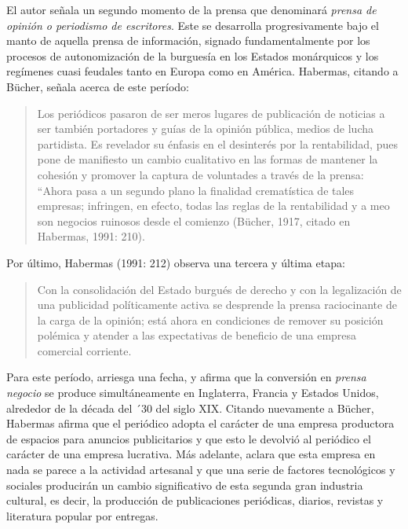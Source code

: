 {El autor señala un segundo momento de la prensa que denominará \emph{prensa de opinión o periodismo de escritores}. Este se desarrolla progresivamente bajo el manto de aquella prensa de información, signado fundamentalmente por los procesos de autonomización de la burguesía en los Estados monárquicos y los regímenes cuasi feudales tanto en Europa como en América. Habermas, citando a Bücher, señala acerca de este período:

\begin{quote}
Los periódicos pasaron de ser meros lugares de publicación de noticias a ser también portadores y guías de la opinión pública, medios de lucha partidista. Es revelador su énfasis en el desinterés por la rentabilidad, pues pone de manifiesto un cambio cualitativo en las formas de mantener la cohesión y promover la captura de voluntades a través de la prensa: ``Ahora pasa a un segundo plano la finalidad crematística de tales empresas; infringen, en efecto, todas las reglas de la rentabilidad y a meo son negocios ruinosos desde el comienzo (Bücher, 1917, citado en Habermas, 1991: 210).
\end{quote}

Por último, Habermas (1991: 212) observa una tercera y última etapa:

\begin{quote}
Con la consolidación del Estado burgués de derecho y con la legalización de una publicidad políticamente activa se desprende la prensa raciocinante de la carga de la opinión; está ahora en condiciones de remover su posición polémica y atender a las expectativas de beneficio de una empresa comercial corriente.
\end{quote}

Para este período, arriesga una fecha, y afirma que la conversión en \emph{prensa negocio} se produce simultáneamente en Inglaterra, Francia y Estados Unidos, alrededor de la década del ´30 del siglo XIX. Citando nuevamente a Bücher, Habermas afirma que el periódico adopta el carácter de una empresa productora de espacios para anuncios publicitarios y que esto le devolvió al periódico el carácter de una empresa lucrativa. Más adelante, aclara que esta empresa en nada se parece a la actividad artesanal y que una serie de factores tecnológicos y sociales producirán un cambio significativo de esta segunda gran industria cultural, es decir, la producción de publicaciones periódicas, diarios, revistas y literatura popular por entregas.

}
